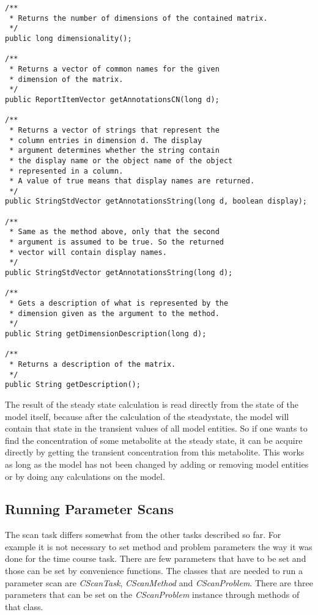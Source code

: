 \documentclass[a4,10pt]{article}
\begin{document}
\begin{lstlisting}
/**
 * Returns the number of dimensions of the contained matrix.
 */
public long dimensionality();

/**
 * Returns a vector of common names for the given 
 * dimension of the matrix.
 */
public ReportItemVector getAnnotationsCN(long d);

/**
 * Returns a vector of strings that represent the 
 * column entries in dimension d. The display
 * argument determines whether the string contain
 * the display name or the object name of the object 
 * represented in a column.
 * A value of true means that display names are returned.
 */
public StringStdVector getAnnotationsString(long d, boolean display);

/**
 * Same as the method above, only that the second
 * argument is assumed to be true. So the returned
 * vector will contain display names.
 */
public StringStdVector getAnnotationsString(long d);

/**
 * Gets a description of what is represented by the 
 * dimension given as the argument to the method.
 */  
public String getDimensionDescription(long d);

/**
 * Returns a description of the matrix.
 */
public String getDescription();
\end{lstlisting}

The result of the steady state calculation is read directly from the state of the model itself, because after the calculation of the steadystate, the model will contain that state in the transient values of all model entities. So if one wants to find the concentration of some metabolite at the steady state, it can be acquire directly by getting the transient concentration from this metabolite.
This works as long as the model has not been changed by adding or removing model entities or by doing any calculations on the model.


\subsection{Running Parameter Scans}
The scan task differs somewhat from the other tasks described so far. For example it is not necessary to set method and problem parameters the way it was done for the time course task.
There are few parameters that have to be set and those can be set by convenience functions.
The classes that are needed to run a parameter scan are \textit{CScanTask}, \textit{CScanMethod} and \textit{CScanProblem}.
There are three parameters that can be set on the \textit{CScanProblem} instance through methods of that class.
\end{document}
